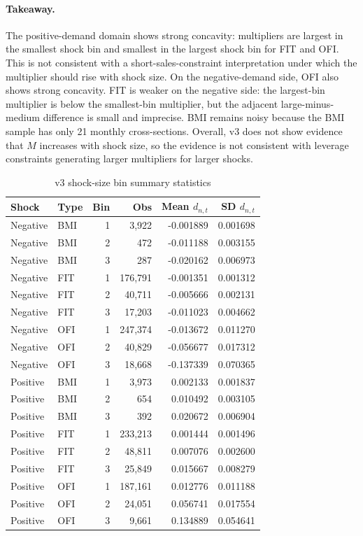 \documentclass[11pt]{article}
\begin{document}
\paragraph{Takeaway.}
The positive-demand domain shows strong concavity: multipliers are largest in
the smallest shock bin and smallest in the largest shock bin for FIT and OFI.
This is not consistent with a short-sales-constraint interpretation under
which the multiplier should rise with shock size. On the negative-demand side,
OFI also shows strong concavity. FIT is weaker on the negative side: the
largest-bin multiplier is below the smallest-bin multiplier, but the adjacent
large-minus-medium difference is small and imprecise. BMI remains noisy because
the BMI sample has only 21 monthly cross-sections. Overall, v3 does not show
evidence that $M$ increases with shock size, so the evidence is not consistent
with leverage constraints generating larger multipliers for larger shocks.

\begin{table}[H]
\centering
\caption{v3 shock-size bin summary statistics}
\label{tab:v3_bin_summary}
\begin{tabular}{llrrrr}
\toprule
Shock & Type & Bin & Obs & Mean $d_{n,t}$ & SD $d_{n,t}$ \\
\midrule
Negative & BMI & 1 & 3,922 & -0.001889 & 0.001698 \\
Negative & BMI & 2 & 472 & -0.011188 & 0.003155 \\
Negative & BMI & 3 & 287 & -0.020162 & 0.006973 \\
Negative & FIT & 1 & 176,791 & -0.001351 & 0.001312 \\
Negative & FIT & 2 & 40,711 & -0.005666 & 0.002131 \\
Negative & FIT & 3 & 17,203 & -0.011023 & 0.004662 \\
Negative & OFI & 1 & 247,374 & -0.013672 & 0.011270 \\
Negative & OFI & 2 & 40,829 & -0.056677 & 0.017312 \\
Negative & OFI & 3 & 18,668 & -0.137339 & 0.070365 \\
\addlinespace
Positive & BMI & 1 & 3,973 & 0.002133 & 0.001837 \\
Positive & BMI & 2 & 654 & 0.010492 & 0.003105 \\
Positive & BMI & 3 & 392 & 0.020672 & 0.006904 \\
Positive & FIT & 1 & 233,213 & 0.001444 & 0.001496 \\
Positive & FIT & 2 & 48,811 & 0.007076 & 0.002600 \\
Positive & FIT & 3 & 25,849 & 0.015667 & 0.008279 \\
Positive & OFI & 1 & 187,161 & 0.012776 & 0.011188 \\
Positive & OFI & 2 & 24,051 & 0.056741 & 0.017554 \\
Positive & OFI & 3 & 9,661 & 0.134889 & 0.054641 \\
\bottomrule
\end{tabular}
\end{table}
\end{document}
